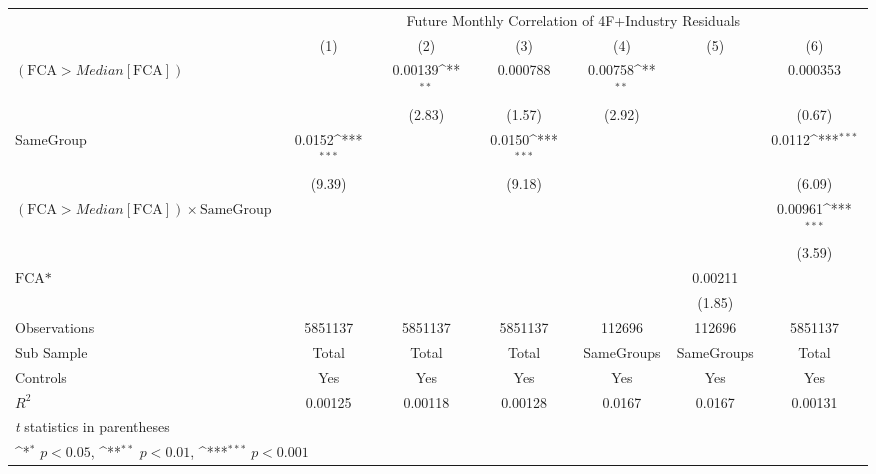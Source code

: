 {
\def\sym#1{\ifmmode^{#1}\else\(^{#1}\)\fi}
\begin{tabular}{l*{6}{c}}
\hline\hline
                &\multicolumn{6}{c}{Future Monthly Correlation of 4F+Industry Residuals}                                          \\\cmidrule(lr){2-7}
                &\multicolumn{1}{c}{(1)}         &\multicolumn{1}{c}{(2)}         &\multicolumn{1}{c}{(3)}         &\multicolumn{1}{c}{(4)}         &\multicolumn{1}{c}{(5)}         &\multicolumn{1}{c}{(6)}         \\
\hline
 $ (\text{FCA} > Median[\text{FCA}]) $ &                  &  0.00139\sym{**} & 0.000788         &  0.00758\sym{**} &                  & 0.000353         \\
                &                  &   (2.83)         &   (1.57)         &   (2.92)         &                  &   (0.67)         \\
[1em]
SameGroup       &   0.0152\sym{***}&                  &   0.0150\sym{***}&                  &                  &   0.0112\sym{***}\\
                &   (9.39)         &                  &   (9.18)         &                  &                  &   (6.09)         \\
[1em]
 $ (\text{FCA} > Median[\text{FCA}]) \times  {\text{SameGroup} }  $ &                  &                  &                  &                  &                  &  0.00961\sym{***}\\
                &                  &                  &                  &                  &                  &   (3.59)         \\
[1em]
$ \text{FCA*} $ &                  &                  &                  &                  &  0.00211         &                  \\
                &                  &                  &                  &                  &   (1.85)         &                  \\
\hline
Observations    &  5851137         &  5851137         &  5851137         &   112696         &   112696         &  5851137         \\
Sub Sample      &    Total         &    Total         &    Total         &SameGroups         &SameGroups         &    Total         \\
Controls        &      Yes         &      Yes         &      Yes         &      Yes         &      Yes         &      Yes         \\
$ R^2 $         &  0.00125         &  0.00118         &  0.00128         &   0.0167         &   0.0167         &  0.00131         \\
\hline\hline
\multicolumn{7}{l}{\footnotesize \textit{t} statistics in parentheses}\\
\multicolumn{7}{l}{\footnotesize \sym{*} \(p<0.05\), \sym{**} \(p<0.01\), \sym{***} \(p<0.001\)}\\
\end{tabular}
}

